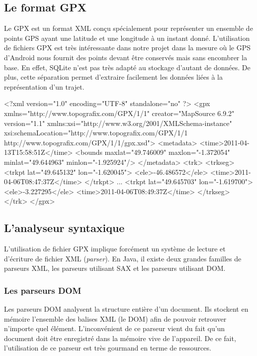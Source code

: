 \subsection{Le format GPX}
Le GPX est un format XML conçu spécialement pour représenter un ensemble de points GPS ayant une latitude et une longitude à un instant donné. L'utilisation de fichiers GPX est très intéressante dans notre projet dans la mesure où le GPS d'Android nous fournit des points devant être conservés mais sans encombrer la base. En effet, SQLite n'est pas très adapté au stockage d'autant de données. De plus, cette séparation permet d'extraire facilement les données liées à la représentation d'un trajet.

\begin{xml}
<?xml version="1.0" encoding="UTF-8" standalone="no" ?>
<gpx xmlns="http://www.topografix.com/GPX/1/1" creator="MapSource 6.9.2" version="1.1" xmlns:xsi="http://www.w3.org/2001/XMLSchema-instance" xsi:schemaLocation="http://www.topografix.com/GPX/1/1 http://www.topografix.com/GPX/1/1/gpx.xsd">
  <metadata>
    <time>2011-04-13T15:58:51Z</time>
    <bounds maxlat="49.746009" maxlon="-1.372054" minlat="49.644963" minlon="-1.925924"/>
  </metadata>
  <trk>
    <trkseg>
      <trkpt lat="49.645132" lon="-1.620045">
        <ele>-46.486572</ele>
        <time>2011-04-06T08:47:37Z</time>
      </trkpt>
     ...
      <trkpt lat="49.645703" lon="-1.619700">
        <ele>-3.227295</ele>
        <time>2011-04-06T08:49:37Z</time>
    </trkseg>
  </trk>
</gpx>
\end{xml}

\subsection{L'analyseur syntaxique}
L'utilisation de fichier GPX implique forcément un système de lecture et d'écriture de fichier XML (\textit{parser}). En Java, il existe deux grandes familles de parseurs XML, les parseurs utilisant SAX et les parseurs utilisant DOM.

\subsubsection{Les parseurs DOM}
Les parseurs DOM analysent la structure entière d'un document. Ils stockent en mémoire l'ensemble des balises XML (le DOM) afin de pouvoir retrouver n'importe quel élément. L'inconvénient de ce parseur vient du fait qu'un document doit être enregistré dans la mémoire vive de l'appareil. De ce fait, l'utilisation de ce parseur est très gourmand en terme de ressources.


